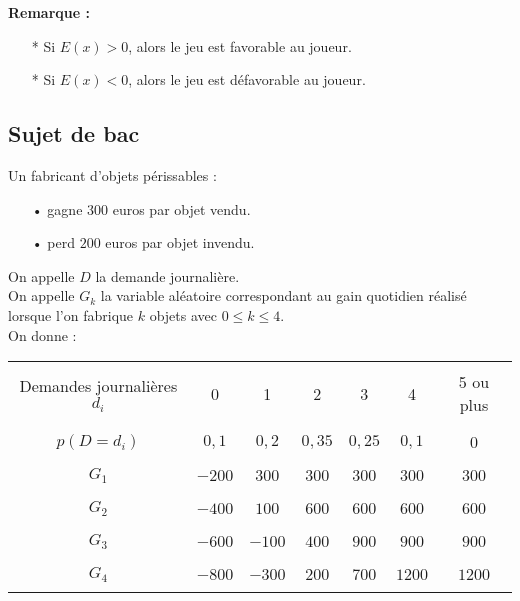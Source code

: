 \textbf{Remarque :} \\

\begin{itemize}
\item[*] Si $E(x) > 0$, alors le jeu est favorable au joueur.  
\item[*] Si $E(x) < 0$, alors le jeu est défavorable au joueur. 
\end{itemize} 

\newpage

\subsection{Sujet de bac}

Un fabricant d'objets périssables : \\

\begin{itemize}
\item[•] gagne $300$ euros par objet vendu.
\item[•] perd $200$ euros par objet invendu. 
\end{itemize}

\vspace*{.3cm}

On appelle $D$ la demande journalière. \\
On appelle $G_k$ la variable aléatoire correspondant au gain quotidien réalisé lorsque l'on fabrique $k$ objets avec $0 \leqslant k \leqslant 4$. \\

On donne : \\

\begin{tabular}{|c|c|c|c|c|c|c|}
\hline
& & & & & & \\
Demandes journalières $d_i$ & 0 & 1 & 2 & 3 & 4 & 5 ou plus \\
& & & & & & \\
\hline
& & & & & & \\
$p\left(D = d_i\right)$ & $0,1$ & $0,2$ & $0,35$ & $0,25$ & $0,1$ & $0$ \\
& & & & & & \\
\hline
& & & & & & \\
$G_1$ & $-200$ & $300$ & $300$ & $300$ & $300$ & $300$ \\
& & & & & & \\
\hline
& & & & & & \\
$G_2$ & $-400$ & $100$ & $600$ & $600$ & $600$ & $600$ \\
& & & & & & \\
\hline
& & & & & & \\
$G_3$ & $-600$ & $-100$ & $400$ & $900$ & $900$ & $900$ \\
& & & & & & \\
\hline
& & & & & & \\
$G_4$ & $-800$ & $-300$ & $200$ & $700$ & $1200$ & $1200$ \\
& & & & & & \\
\hline
\end{tabular}

